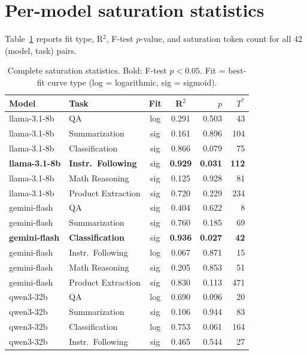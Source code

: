 \clearpage
\section{Per-model saturation statistics}
\label{app:stats}

Table~\ref{tab:full-stats} reports fit type, R$^2$, F-test $p$-value, and
saturation token count for all 42 (model, task) pairs.

\begin{table}[h]
\centering
\caption{Complete saturation statistics. Bold: F-test $p < 0.05$.
  Fit = best-fit curve type (log = logarithmic, sig = sigmoid).}
\label{tab:full-stats}
\footnotesize
\begin{tabular}{llccrr}
\toprule
Model & Task & Fit & R$^2$ & $p$ & $T^*$ \\
\midrule
llama-3.1-8b  & QA                 & log & 0.291 & 0.503 & 43  \\
llama-3.1-8b  & Summarization      & sig & 0.161 & 0.896 & 104 \\
llama-3.1-8b  & Classification     & sig & 0.866 & 0.079 & 75  \\
\textbf{llama-3.1-8b}  & \textbf{Instr.\ Following} & sig & \textbf{0.929} & \textbf{0.031} & \textbf{112} \\
llama-3.1-8b  & Math Reasoning     & sig & 0.125 & 0.928 & 81  \\
llama-3.1-8b  & Product Extraction & sig & 0.720 & 0.229 & 234 \\
\midrule
gemini-flash  & QA                 & sig & 0.404 & 0.622 & 8   \\
gemini-flash  & Summarization      & sig & 0.760 & 0.185 & 69  \\
\textbf{gemini-flash}  & \textbf{Classification}    & sig & \textbf{0.936} & \textbf{0.027} & \textbf{42}  \\
gemini-flash  & Instr.\ Following  & log & 0.067 & 0.871 & 15  \\
gemini-flash  & Math Reasoning     & sig & 0.205 & 0.853 & 51  \\
gemini-flash  & Product Extraction & sig & 0.830 & 0.113 & 471 \\
\midrule
qwen3-32b     & QA                 & log & 0.690 & 0.096 & 20  \\
qwen3-32b     & Summarization      & sig & 0.106 & 0.944 & 83  \\
qwen3-32b     & Classification     & log & 0.753 & 0.061 & 164 \\
qwen3-32b     & Instr.\ Following  & sig & 0.465 & 0.544 & 27  \\

\end{tabular}
\end{table}
